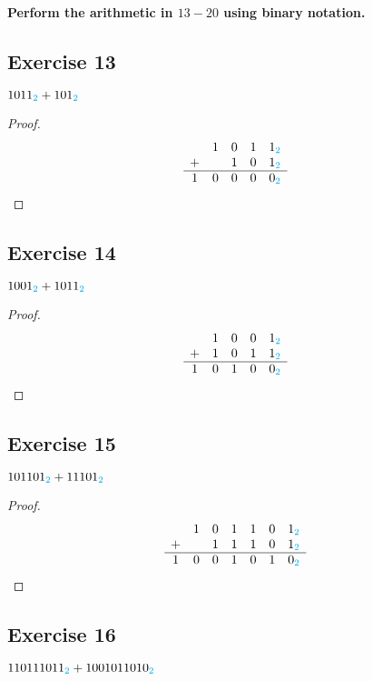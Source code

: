\documentclass[14pt]{extarticle}
\newcommand{\base}[1]{{\color{cyan}#1}}
\begin{document}
{\bf \color{cyan} Perform the arithmetic in $13-20$ using binary notation.}

\subsection{Exercise 13}
$1011_\base{2} + 101_\base{2}$

\begin{proof}
    $$
        \begin{array}{ccccc}
              & 1 & 0 & 1 & 1_\base{2} \\ +& &1&0&1_\base{2}\\
            \hline
            1 & 0 & 0 & 0 & 0_\base{2} \\
        \end{array}
    $$
\end{proof}

\subsection{Exercise 14}
$1001_\base{2} + 1011_\base{2}$

\begin{proof}
    $$
        \begin{array}{ccccc}
              & 1 & 0 & 0 & 1_\base{2} \\
            + & 1 & 0 & 1 & 1_\base{2} \\
            \hline
            1 & 0 & 1 & 0 & 0_\base{2} \\
        \end{array}
    $$
\end{proof}

\subsection{Exercise 15}
$101101_\base{2} + 11101_\base{2}$

\begin{proof}
    $$
        \begin{array}{ccccccc}
              & 1 & 0 & 1 & 1 & 0 & 1_\base{2} \\
            + &   & 1 & 1 & 1 & 0 & 1_\base{2} \\
            \hline
            1 & 0 & 0 & 1 & 0 & 1 & 0_\base{2} \\
        \end{array}
    $$
\end{proof}

\subsection{Exercise 16}
$110111011_\base{2} + 1001011010_\base{2}$
\end{document}
